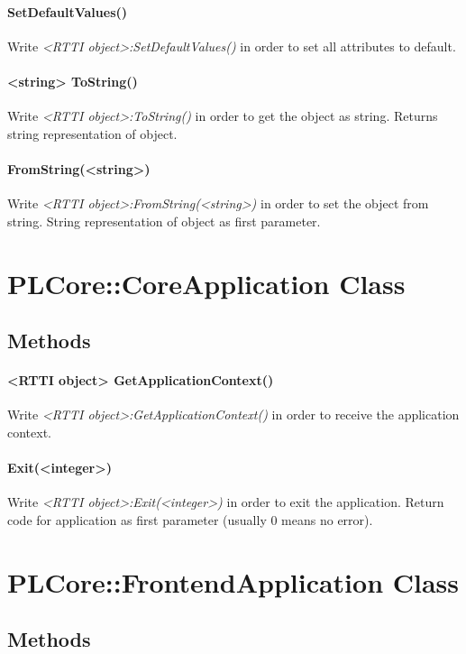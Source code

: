 \paragraph{SetDefaultValues()}
Write \emph{<RTTI object>:SetDefaultValues()} in order to set all attributes to default.

\paragraph{<string> ToString()}
Write \emph{<RTTI object>:ToString()} in order to get the object as string. Returns string representation of object.

\paragraph{FromString(<string>)}
Write \emph{<RTTI object>:FromString(<string>)} in order to set the object from string. String representation of object as first parameter.




\section{PLCore::CoreApplication Class}


\subsection{Methods}

\paragraph{<RTTI object> GetApplicationContext()}
Write \emph{<RTTI object>:GetApplicationContext()} in order to receive the application context.

\paragraph{Exit(<integer>)}
Write \emph{<RTTI object>:Exit(<integer>)} in order to exit the application. Return code for application as first parameter (usually 0 means no error).




\section{PLCore::FrontendApplication Class}


\subsection{Methods}

